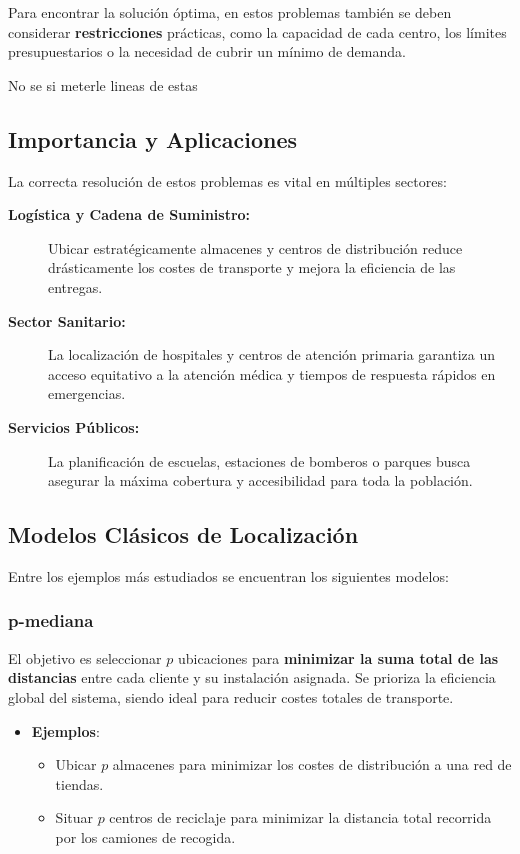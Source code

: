 \documentclass[12pt,a4paper]{book}
\begin{document}
Para encontrar la solución óptima, en estos problemas también se deben considerar \textbf{restricciones} prácticas, como la capacidad de cada centro, los límites presupuestarios o la necesidad de cubrir un mínimo de demanda.

\color{red}No se si meterle lineas de estas \color{black}

\hrulefill

\subsection{Importancia y Aplicaciones}

La correcta resolución de estos problemas es vital en múltiples sectores:
\begin{description}
    \item[\textbf{Logística y Cadena de Suministro:}] Ubicar estratégicamente almacenes y centros de distribución reduce drásticamente los costes de transporte y mejora la eficiencia de las entregas.
    \item[\textbf{Sector Sanitario:}] La localización de hospitales y centros de atención primaria garantiza un acceso equitativo a la atención médica y tiempos de respuesta rápidos en emergencias.
    \item[\textbf{Servicios Públicos:}] La planificación de escuelas, estaciones de bomberos o parques busca asegurar la máxima cobertura y accesibilidad para toda la población.
\end{description}

\hrulefill

\subsection*{Modelos Clásicos de Localización}

Entre los ejemplos más estudiados se encuentran los siguientes modelos:

\subsubsection{p-mediana}
El objetivo es seleccionar $p$ ubicaciones para \textbf{minimizar la suma total de las distancias} entre cada cliente y su instalación asignada. Se prioriza la eficiencia global del sistema, siendo ideal para reducir costes totales de transporte.
\begin{itemize}
    \item \textbf{Ejemplos}:
    \begin{itemize}
        \item Ubicar $p$ almacenes para minimizar los costes de distribución a una red de tiendas.
        \item Situar $p$ centros de reciclaje para minimizar la distancia total recorrida por los camiones de recogida.
    \end{itemize}
\end{itemize}
\end{document}

